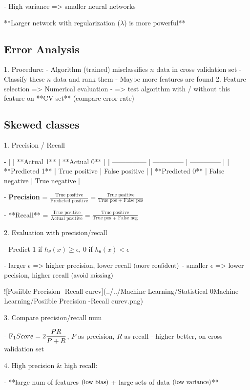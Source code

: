 - High variance => smaller neural networks

**Larger network with regularization ($\lambda$) is more powerful**

\subsection{Error Analysis}

1. Procedure:
- Algorithm (trained) misclassifies $n$ data in cross validation set
- Classify these $n$ data and rank them
- Maybe more features are found
2. Feature selection => Numerical evaluation
- => test algorithm with / without this feature on **CV set** (compare error rate)

\subsection{Skewed classes}

1. Precision / Recall

- |                 | **Actual 1**   | **Actual 0**   |
| --------------- | -------------- | -------------- |
| **Predicted 1** | True positive  | False positive |
| **Predicted 0** | False negative | True negative  |

- \textbf{Precision} = $\displaystyle \frac{\text {True positive}}{\text{Predicted positive}} = \frac{\text {True positive}}{\text{True pos + False pos}}$

- **Recall** = $\displaystyle \frac{\text{True positive}}{\text{Actual positive}} = \frac{\text{True positive}}{\text{True pos + False neg}}$

2. Evaluation with precision/recall

- Predict 1 if $ h_\theta(x) \geq \epsilon$, 0 if $h_\theta(x) < \epsilon$

- larger $\epsilon$ => higher precision, lower recall $\small \text{(more confident)}$ 
- smaller $\epsilon$ => lower pecision, higher recall $\small \text{(avoid missing)}$       

![Posiible Precision -Recall curev](../../Machine Learning/Statistical 0Machine Learning/Posiible Precision -Recall curev.png)  

3. Compare precision/recall num

- $\displaystyle \text{F}_1 \space  Score = 2\frac{PR}{P+R}$, $P$ as precision, $R$ as recall
- higher better, on cross validation set

4. High precision \& high recall:

- **large num of features $\small\text{(low bias)}$ + large sets of data $\small\text{(low variance)}$**

